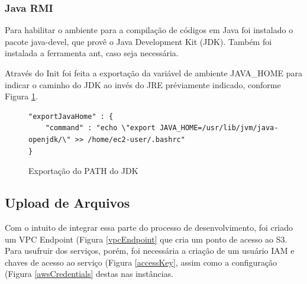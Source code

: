 \documentclass[tg]{mdtufsm}
\begin{document}
\subsubsection{Java RMI}

Para habilitar o ambiente para a compilação de códigos em Java foi instalado o pacote java-devel, que provê o Java Development Kit (JDK). Também foi instalada a ferramenta ant, caso seja necessária.

Através do Init foi feita a exportação da variável de ambiente JAVA\_HOME para indicar o caminho do JDK ao invés do JRE préviamente indicado, conforme Figura \ref{javaHome}.

\begin{figure}
\centering
\begin{lstlisting}[frame=single, numbers=none]
"exportJavaHome" : {
	"command" : "echo \"export JAVA_HOME=/usr/lib/jvm/java-openjdk/\" >> /home/ec2-user/.bashrc"
}
\end{lstlisting}
\caption{Exportação do PATH do JDK}
\label{javaHome}
\end{figure}


\subsection{Upload de Arquivos}

Com o intuito de integrar essa parte do processo de desenvolvimento, foi criado um VPC Endpoint (Figura \ref{vpcEndpoint} que cria um ponto de acesso ao S3. Para usufruir dos serviços, porém, foi necessária a criação de um usuário IAM e chaves de acesso ao serviço (Figura \ref{accessKey}, assim como a configuração (Figura \ref{awsCredentials} destas nas instâncias.
\end{document}
